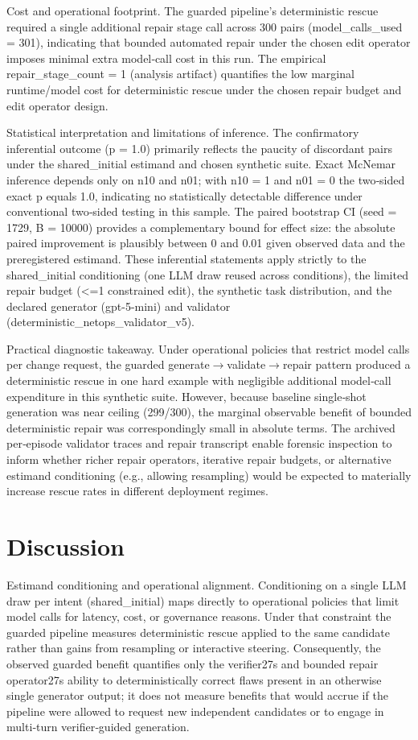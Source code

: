 \documentclass[conference]{IEEEtran}
\begin{document}
Cost and operational footprint. The guarded pipeline's deterministic rescue required a single additional repair stage call across 300 pairs (model\_calls\_used = 301), indicating that bounded automated repair under the chosen edit operator imposes minimal extra model‑call cost in this run. The empirical repair\_stage\_count = 1 (analysis artifact) quantifies the low marginal runtime/model cost for deterministic rescue under the chosen repair budget and edit operator design.

Statistical interpretation and limitations of inference. The confirmatory inferential outcome (p = 1.0) primarily reflects the paucity of discordant pairs under the shared\_initial estimand and chosen synthetic suite. Exact McNemar inference depends only on n10 and n01; with n10 = 1 and n01 = 0 the two‑sided exact p equals 1.0, indicating no statistically detectable difference under conventional two‑sided testing in this sample. The paired bootstrap CI (seed = 1729, B = 10000) provides a complementary bound for effect size: the absolute paired improvement is plausibly between 0 and 0.01 given observed data and the preregistered estimand. These inferential statements apply strictly to the shared\_initial conditioning (one LLM draw reused across conditions), the limited repair budget (<=1 constrained edit), the synthetic task distribution, and the declared generator (gpt-5-mini) and validator (deterministic\_netops\_validator\_v5).

Practical diagnostic takeaway. Under operational policies that restrict model calls per change request, the guarded generate\ensuremath{\rightarrow}validate\ensuremath{\rightarrow}repair pattern produced a deterministic rescue in one hard example with negligible additional model‑call expenditure in this synthetic suite. However, because baseline single‑shot generation was near ceiling (299/300), the marginal observable benefit of bounded deterministic repair was correspondingly small in absolute terms. The archived per‑episode validator traces and repair transcript enable forensic inspection to inform whether richer repair operators, iterative repair budgets, or alternative estimand conditioning (e.g., allowing resampling) would be expected to materially increase rescue rates in different deployment regimes.

\section{Discussion}
Estimand conditioning and operational alignment. Conditioning on a single LLM draw per intent (shared\_initial) maps directly to operational policies that limit model calls for latency, cost, or governance reasons. Under that constraint the guarded pipeline measures deterministic rescue applied to the same candidate rather than gains from resampling or interactive steering. Consequently, the observed guarded benefit quantifies only the verifier 27s and bounded repair operator 27s ability to deterministically correct flaws present in an otherwise single generator output; it does not measure benefits that would accrue if the pipeline were allowed to request new independent candidates or to engage in multi‑turn verifier‑guided generation.
\end{document}
